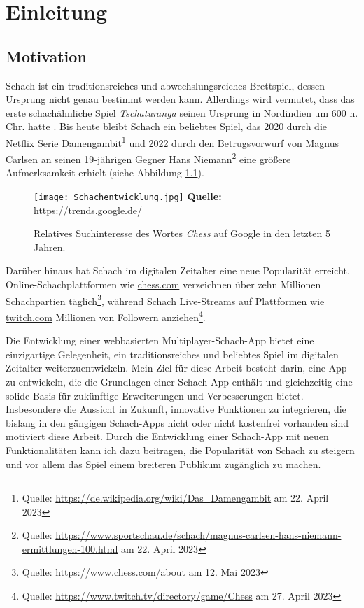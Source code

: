 \chapter{Einleitung}
    \section{Motivation}
    Schach ist ein traditionsreiches und abwechslungsreiches Brettspiel, dessen Ursprung nicht genau bestimmt werden kann. Allerdings wird vermutet, dass das erste schachähnliche Spiel  \textit{Tschaturanga} seinen Ursprung in Nordindien um 600 n. Chr. hatte \cite{schachgeschichte}. Bis heute bleibt Schach ein beliebtes Spiel, das 2020 durch die Netflix Serie \glqq Damengambit\grqq \footnote{Quelle: \url{https://de.wikipedia.org/wiki/Das_Damengambit} am 22. April 2023} und 2022 durch den Betrugsvorwurf von Magnus Carlsen an seinen 19-jährigen Gegner Hans Niemann\footnote{Quelle: \url{https://www.sportschau.de/schach/magnus-carlsen-hans-niemann-ermittlungen-100.html} am 22. April 2023} eine größere Aufmerksamkeit erhielt (siehe Abbildung \ref{fig:Schachinteresse}). 
    
    \begin{figure}[ht]
\raggedleft
  \texttt{[image: Schachentwicklung.jpg]}
    \footnotesize\sffamily\textbf{Quelle:} \url{https://trends.google.de/}
  \caption{Relatives Suchinteresse des Wortes \textit{Chess} auf Google in den letzten 5 Jahren.}
  \label{fig:Schachinteresse}
\end{figure}

     Darüber hinaus hat Schach im digitalen Zeitalter eine neue Popularität erreicht. Online-Schachplattformen wie \url{chess.com} verzeichnen über zehn Millionen Schachpartien täglich\footnote{Quelle: \url{https://www.chess.com/about} am 12. Mai 2023}, während Schach Live-Streams auf Plattformen wie \url{twitch.com} Millionen von Followern anziehen\footnote{Quelle: \url{https://www.twitch.tv/directory/game/Chess} am 27. April 2023}.
     
Die Entwicklung einer webbasierten Multiplayer-Schach-App bietet eine einzigartige Gelegenheit, ein traditionsreiches und beliebtes Spiel im digitalen Zeitalter weiterzuentwickeln. Mein Ziel für diese Arbeit besteht darin, eine App zu entwickeln, die die Grundlagen einer Schach-App enthält und gleichzeitig eine solide Basis für zukünftige Erweiterungen und Verbesserungen bietet.
Insbesondere die Aussicht in Zukunft, innovative Funktionen zu integrieren, die bislang in den gängigen Schach-Apps nicht oder nicht kostenfrei vorhanden sind motiviert diese Arbeit. Durch die Entwicklung einer Schach-App mit neuen Funktionalitäten kann ich dazu beitragen, die Popularität von Schach zu steigern und vor allem das Spiel einem breiteren Publikum zugänglich zu machen.

